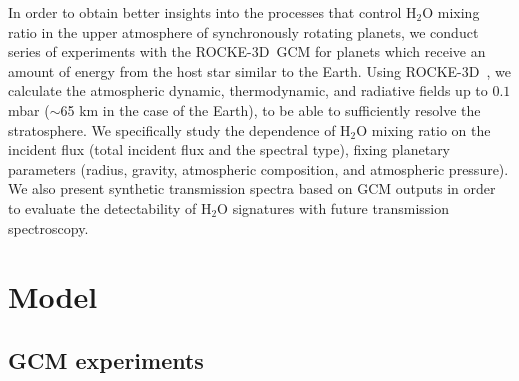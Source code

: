 \documentclass[11pt,numberedappendix,twocolappendix,]{emulateapj}
\def\water{H$_2$O }
\def\modelE{ROCKE-3D}
\def\memo#1{\color{red}$[${\bf #1}$]$ \color{black}}
\newcommand{\dsa}[1]{{\color{blue}#1}}
\begin{document}

In order to obtain better insights into the processes that control \water mixing ratio in the upper \dsa{atmosphere} of synchronously rotating planets, we conduct series of experiments with the \modelE \ GCM for planets which receive an amount of energy from the host star similar to the \dsa{Earth}. 
Using \modelE \ , we calculate the atmospheric dynamic, thermodynamic, and radiative fields up to $0.1$ mbar ($\sim $65 km in the case of the Earth), to be able to sufficiently resolve the stratosphere. 
We specifically study the dependence of \water mixing ratio on the incident flux (total incident flux and the spectral type), fixing planetary parameters (radius, gravity, atmospheric composition, and atmospheric pressure). 
We also present \dsa{synthetic} transmission spectra based on GCM outputs in order to evaluate the detectability of \water signatures with future transmission spectroscopy. 




\section{Model}
\label{s:model}

\subsection{GCM experiments}
\end{document}
